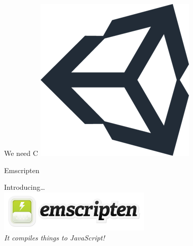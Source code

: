 \documentclass{lug}
\begin{document}
\begin{frame}{We need C}
{{        \includegraphics[width=\columnwidth]{graphics/unity_logo}
    }}
\end{frame}

\begin{frame}{Emscripten}
    \begin{center}
        Introducing\dots\\
        \includegraphics[height=2cm]{graphics/emscripten_logo} \\
        \vspace{1cm}
        \textit{It compiles things to JavaScript!}
    \end{center}
\end{frame}
\end{document}
